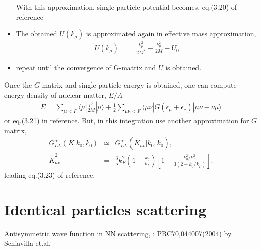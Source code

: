 \documentclass[10pt]{article}
\newcommand{\bea}{\begin{eqnarray}}
\newcommand{\eea}{\end{eqnarray}}
\newcommand{\no}{\nonumber \\}
\def\la{\langle}
\def\ra{\rangle}
\begin{document}
\begin{itemize}
With this approximation, single particle potential becomes, eq.(3.20) of reference

\item The obtained $U(k_\mu)$ is approximated again in effective mass approximation,
    \bea 
      U(k_\mu)&=&\frac{k_\mu^2}{2M^*}-\frac{k_\mu^2}{2M}-U_0
    \eea 

\item repeat until the convergence of G-matrix and $U$ is obtained.

\end{itemize} 
Once the $G$-matrix and single particle energy is obtained, one can compute energy density
of nuclear matter, $E/A$ 
\bea
E=\sum_{\mu<F }\la \mu|\frac{p^2}{2M}|\mu\ra 
 +\frac{1}{2}\sum_{\mu\nu<F}\la \mu\nu|G(\epsilon_\mu+\epsilon_\nu)|\mu\nu-\nu\mu\ra 
\eea 
or eq.(3.21) in reference. But, in this integration use another approximation 
for $G$ matrix,
\bea 
G^\alpha_{LL}(K|k_0,k_0)&\simeq& G^\alpha_{LL}(\tilde{K}_{av}|k_0,k_0),\no 
\tilde{K}_{av}^2&=& \frac{3}{5}k_F^2(1-\frac{k_0}{k_F})[1+\frac{k_0^2/k_F^2}{3(2+k_0/k_F)}].
\eea 
leading eq.(3.23) of reference.

\newpage
\section{Identical particles scattering}
Antisymmetric wave function in 
NN scattering, 
: PRC70,044007(2004) by Schiavilla et.al.
\end{document}
